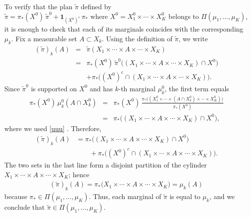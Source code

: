 \documentclass[twoside,11pt,a4paper]{article}
\newcommand*{\SavedEqref}{}
\let\SavedEqref\eqref
\renewcommand*{\eqref}[1]{  \begingroup
    \hypersetup{
      linkcolor=linkequation,
      linkbordercolor=linkequation,
    }    \SavedEqref{#1}  \endgroup
}
\begin{document}
\begin{remark}\label{rmq}
\noindent
\item To verify that the plan \(\widetilde{\pi}\) defined by $\widetilde{\pi}=\pi_*(X^0)\,\widetilde{\pi}^0+\mathbf{1}_{(X^0)^c}\,\pi_*
\text{ where } X^0=X_1^0\times\cdots\times X_K^0$
belongs to \(\Pi(\mu_1,\dots,\mu_K)\), it is enough to check that each of its marginals coincides with the corresponding $\mu_k$. Fix a measurable set \(A\subset X_k\). Using the definition of
\(\widetilde{\pi}\), we write
\begin{eqnarray*}
(\widetilde{\pi})_k(A)
&=& \widetilde{\pi}(X_1\times\cdots\times A\times\cdots\times X_K)
\\
&=& \pi_*(X^0)\,
     \widetilde{\pi}^0\!\big((X_1\times\cdots\times A\times\cdots\times X_K)\cap X^0\big)
\\
&&
   +\pi_*\!\big((X^0)^c\cap(X_1\times\cdots\times A\times\cdots\times X_K)\big).
\end{eqnarray*}
Since \(\widetilde{\pi}^0\) is supported on \(X^0\) and has \(k\)-th marginal \(\mu_k^0\),
the first term equals
\begin{eqnarray*}
\pi_*(X^0)\,\mu_k^0(A\cap X_k^0)
&=&\pi_*(X^0)\,
\frac{\pi_*\!\big((X_1^0\times\cdots\times(A\cap X_k^0)\times\cdots\times X_K^0)\big)}{\pi_*(X^0)}\\
&=&\pi_*\!\big((X_1\times\cdots\times A\times\cdots\times X_K)\cap X^0\big),
\end{eqnarray*}
where we used \eqref{uuu}. Therefore,
\begin{align*}
(\widetilde{\pi})_k(A)
&=
\pi_*\big((X_1\times\cdots\times A\times\cdots\times X_K)\cap X^0\big)
\\
&\qquad+
\pi_*\big((X^0)^c\cap(X_1\times\cdots\times A\times\cdots\times X_K)\big).
\end{align*}
The two sets in the last line form a disjoint partition of the cylinder
\(X_1\times\cdots\times A\times\cdots\times X_K\); hence
\begin{align*}
(\widetilde{\pi})_k(A)
=\pi_*\big(X_1\times\cdots\times A\times\cdots\times X_K\big)
=\mu_k(A)
\end{align*}
because \(\pi_*\in\Pi(\mu_1,\dots,\mu_K)\). Thus, each marginal of \(\widetilde{\pi}\) is
equal to \(\mu_k\), and we conclude that \(\widetilde{\pi}\in\Pi(\mu_1,\dots,\mu_K)\).

\end{remark}
\end{document}
